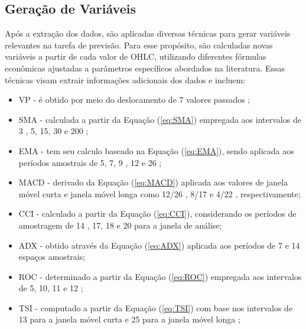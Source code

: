 \subsection{Geração de Variáveis}
\label{subsec:feature_generate}
Após a extração dos dados, são aplicadas diversas técnicas para gerar variáveis relevantes na tarefa de previsão. Para esse propósito, são calculadas novas variáveis a partir de cada valor de \ac{OHLC}, utilizando diferentes fórmulas econômicas ajustadas a parâmetros específicos abordados na literatura. Essas técnicas visam extrair informações adicionais dos dados e incluem:
\begin{itemize}
    \item \ac{VP} - é obtido por meio do deslocamento de 7 valores passados \cite{vinicius_sistemas};

    \item \ac{SMA} - calculada a partir da Equação (\ref{eq:SMA}) empregada aos intervalos de 3 \cite{chantarakasemchit2020forex}, 5, 15, 30 \cite{handayani2019longer} e 200 \cite{ELLIS2005399};
    
    \item \ac{EMA} - tem seu calculo baseado na Equação (\ref{eq:EMA}), sendo aplicada aos períodos amostrais de 5, 7, 9 \cite{ANBALAGAN2015214}, 12 \cite{Charlene} e 26 \cite{ananthi2021retracted};
    
    \item \ac{MACD} - derivado da Equação (\ref{eq:MACD}) aplicada aos valores de janela móvel curta e janela móvel longa como 12/26 \cite{ANBALAGAN2015214, handayani2019longer}, 8/17 e 4/22 \cite{kang2021improving}, respectivamente;
    
    \item \ac{CCI} - calculado a partir da Equação (\ref{eq:CCI}), considerando os períodos de amostragem de 14 \cite{halil2019predicting}, 17, 18 \cite{karasu2022crude} e 20 \cite{kelotra2020stock} para a janela de análise;
    
    \item \ac{ADX} - obtido através da Equação (\ref{eq:ADX}) aplicada aos períodos de 7 \cite{kelotra2020stock} e 14 \cite{shamseddin2022mapping} espaços amostrais;
    
    \item \ac{ROC} - determinado a partir da Equação (\ref{eq:ROC}) empregada aos intervalos de 5, 10, 11 e 12 \cite{karasu2022crude};
    
    \item \ac{TSI} - computado a partir da Equação (\ref{eq:TSI}) com base  nos intervalos de 13 para a janela móvel curta e 25 para a janela móvel longa \cite{nayak2015naive, anwar2019forecasting};
    

\end{itemize}
